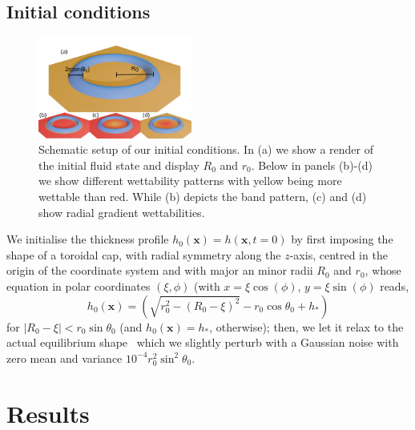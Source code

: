 \documentclass[twoside,twocolumn,9pt]{article}
\begin{document}
\subsection{Initial conditions}
\begin{figure}
\centering
  \includegraphics[width=0.45\textwidth]{Figure_1.pdf}
  \caption{Schematic setup of our initial conditions. In (a) we show a render of the initial fluid state and display $R_0$ and $r_0$. 
  Below in panels (b)-(d) we show different wettability patterns with yellow being more wettable than red.
  While (b) depicts the band pattern, (c) and (d) show radial gradient wettabilities.} 
  \label{fig:ringschema}
\end{figure}

We initialise the thickness profile $h_0(\mathbf{x})=h(\mathbf{x}, t=0)$ by first imposing the shape of a toroidal cap, with radial symmetry along the $z$-axis, centred in the origin of the coordinate system and with major an minor radii $R_0$ and $r_0$, whose equation in polar coordinates $(\xi, \phi)$ (with $x = \xi \cos(\phi)$, $y=\xi \sin(\phi)$ reads,
\begin{equation}\label{eq:torus}
h_0(\mathbf{x})=\left(\sqrt{r_0^2 - \left(R_0-\xi\right)^2} - r_0\cos \theta_0 + h_{\ast}\right)
\end{equation}
for $|R_0-\xi|<r_0 \sin \theta_0$ (and $h_0(\mathbf{x})=h_{\ast}$, otherwise); then, we let it relax to the actual equilibrium shape~\cite{diezBreakupFluidRivulets2009} which we slightly perturb with a Gaussian noise with zero mean and variance $10^{-4}r_0^2 \sin^2\theta_0$. 

\section{Results} \label{sec:results}
\end{document}
